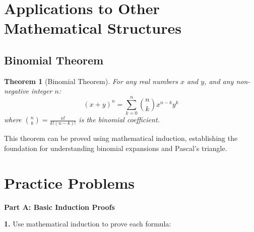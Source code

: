 \documentclass[12pt]{article}
\newtheorem{theorem}{Theorem}
\begin{document}
\section{Applications to Other Mathematical Structures}

\subsection{Binomial Theorem}

\begin{theorem}[Binomial Theorem]
For any real numbers $x$ and $y$, and any non-negative integer $n$:
$$(x + y)^n = \sum_{k=0}^{n} \binom{n}{k} x^{n-k} y^k$$
where $\binom{n}{k} = \frac{n!}{k!(n-k)!}$ is the binomial coefficient.
\end{theorem}

This theorem can be proved using mathematical induction, establishing the foundation for understanding binomial expansions and Pascal's triangle.

\newpage

\section{Practice Problems}

\textbf{Part A: Basic Induction Proofs}

\textbf{1.} Use mathematical induction to prove each formula:
\end{document}
